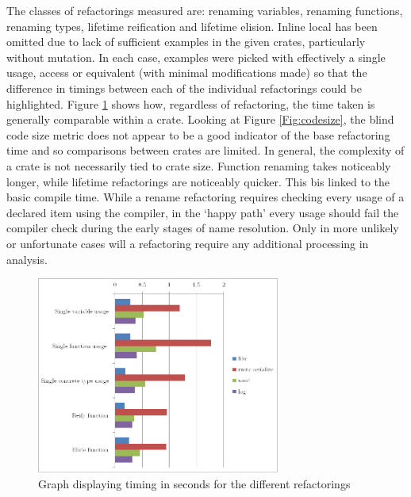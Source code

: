 The classes of refactorings measured are: renaming variables, renaming functions, renaming types, lifetime reification and lifetime elision. Inline local has been omitted due to lack of sufficient examples in the given crates, particularly without mutation. In each case, examples were picked with effectively a single usage, access or equivalent (with minimal modifications made) so that the difference in timings between each of the individual refactorings could be highlighted. Figure \ref{Fig:compareref} shows how, regardless of refactoring, the time taken is generally comparable within a crate. Looking at Figure \ref{Fig:codesize}, the blind code size metric does not appear to be a good indicator of the base refactoring time and so comparisons between crates are limited. In general, the complexity of a crate is not necessarily tied to crate size. Function renaming takes noticeably longer, while lifetime refactorings are noticeably quicker. This bis linked to the basic compile time. While a rename refactoring requires checking every usage of a declared item using the compiler, in the `happy path' every usage should fail the compiler check during the early stages of name resolution. Only in more unlikely or unfortunate cases will a refactoring require any additional processing in analysis.

\begin{figure}[h]
\begin{center}

\includegraphics[width=8cm]{refactorings}

\caption{Graph displaying timing in seconds for the different refactorings}
\label{Fig:compareref}
\end{center}
\end{figure}

